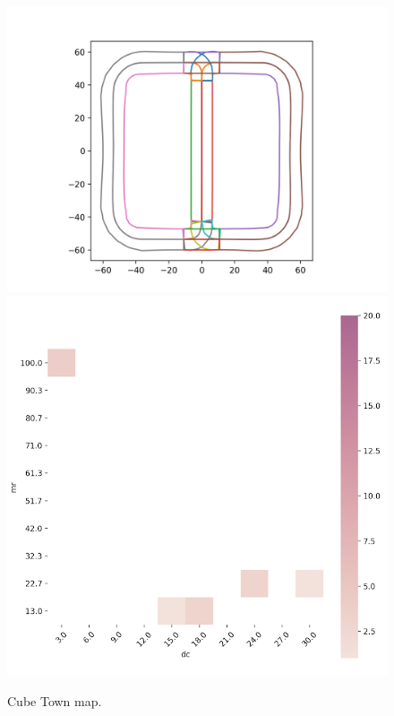 \documentclass[conference]{IEEEtran}
\begin{document}
\begin{figure}[!tp]
\hfill
{}
  \includegraphics[width=\linewidth]{images/map_cubetown}
  \includegraphics[width=\linewidth]{images/feature_cubetown}
  \caption{Cube Town map.}
  \label{fig:feature-maps-cubetown}
\endminipage\hfill
{}

\end{figure}
\end{document}
